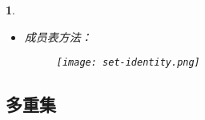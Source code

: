 \documentclass[UTF8]{report}
\theoremstyle{MyLineTheoremStyle} %
\theoremstyle{MyBlockTheoremStyle} %
\theoremstyle{MySubsubsectionStyle} %
\newtheorem{definition}{}
\begin{document}
\begin{definition}
\begin{itemize}
\textbf{子集方法：}\par
\begin{itemize}
    \item $(A \cap B)^c \subseteq A^c \cup B^c$：假设 $x \in (A \cap B)^c$，根据补集定义，$x \notin A \cap B$，由交集定义，$x$ 不同时属于集合 $A$ 和 $B$，那么 $x$ 不属于 $A$ 或者不属于 $B$，根据补集定义这意味着，$x$ 属于 $A^c$ 或者属于 $B^c$，根据并集定义，有 $x \in A^c \cup B^c$
    \item $A^c \cup B^c \subseteq (A \cap B)^c$：假设 $x \in A^c \cup B^c$，根据并集定义，$x$ 属于 $A^c$ 或者属于 $B^c$，根据补集定义这意味着，$x$ 不属于 $A$ 或者不属于 $B$，即 $x$ 不同时属于集合 $A$ 和 $B$，由交集定义，$x \notin A \cap B$，根据补集定义，有 $x \in (A \cap B)^c$
\end{itemize}

\textbf{集合构造器和逻辑等价式方法：}\par
\begin{align*}
    (A \cap B)^c &= \{x \mid x \notin A \cap B\} \quad \text{补集的定义} \\
    &= \{x \mid \neg (x \in A \cap B)\} \quad \text{不属于符号的定义} \\
    &= \{x \mid \neg (x \in A \land x \in B)\} \quad \text{交集的定义} \\
    &= \{x \mid \neg (x \in A) \lor \neg (x \in B)\} \quad \text{德·摩根律} \\
    &= \{x \mid x \notin A \lor x \notin B\} \quad \text{不属于符号的定义} \\
    &= \{x \mid x \in A^c \lor x \in B^c\} \quad \text{补集的定义} \\
    &= \{x \mid x \in A^c \cup B^c\} \quad \text{并集的定义} \\
    &= A^c \cup B^c \quad \text{集合构造器}
\end{align*}
        \item 成员表方法：
        \begin{figure}[ht]
            \centering
            \texttt{[image: set-identity.png]}
        \end{figure}
    \end{itemize}

\end{definition}

\subsection{多重集}
\end{document}
